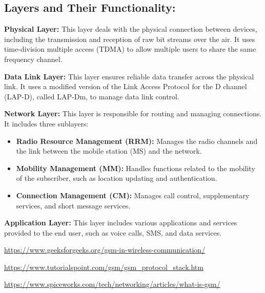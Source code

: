 \documentclass[a4paper]{exam}
\begin{document}
\begin{questions}
\begin{solution}
            \subsection*{Layers and Their Functionality:}
            \begin{parts}
                \item \textbf{Physical Layer:} This layer deals with the physical connection between devices, including the transmission and reception of raw bit streams over the air. It uses time-division multiple access (TDMA) to allow multiple users to share the same frequency channel.
                \item \textbf{Data Link Layer:} This layer ensures reliable data transfer across the physical link. It uses a modified version of the Link Access Protocol for the D channel (LAP-D), called LAP-Dm, to manage data link control.
                \item \textbf{Network Layer:} This layer is responsible for routing and managing connections. It includes three sublayers:
                \begin{itemize}
                    \item \textbf{Radio Resource Management (RRM):} Manages the radio channels and the link between the mobile station (MS) and the network.
                    \item \textbf{Mobility Management (MM):} Handles functions related to the mobility of the subscriber, such as location updating and authentication.
                    \item \textbf{Connection Management (CM):} Manages call control, supplementary services, and short message services.
                \end{itemize}
                \item \textbf{Application Layer:} This layer includes various applications and services provided to the end user, such as voice calls, SMS, and data services.
            \end{parts}
        \begin{thebibliography}{9}
            \url{https://www.geeksforgeeks.org/gsm-in-wireless-communication/}
            
            \url{https://www.tutorialspoint.com/gsm/gsm_protocol_stack.htm}

            \url{https://www.spiceworks.com/tech/networking/articles/what-is-gsm/}


\end{thebibliography}
\end{solution}
\end{questions}
\end{document}
